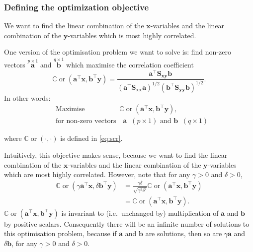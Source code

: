\documentclass[]{book}
\theoremstyle{definition}
\theoremstyle{definition}
\theoremstyle{definition}
\theoremstyle{remark}
\begin{document}
\hypertarget{defining-the-optimization-objective}{%
\subsubsection*{Defining the optimization objective}\label{defining-the-optimization-objective}}

We want to find the linear combination of the \(\mathbf x\)-variables and the linear combination of the \(\mathbf y\)-variables which is most highly correlated.

One version of the optimisation problem we want to solve is: find non-zero vectors \(\stackrel{p \times 1}{\mathbf a}\) and \(\stackrel{q \times 1}{\mathbf b}\) which maximise the correlation coefficient
\[
{\mathbb{C}\operatorname{or}}(\mathbf a^\top \mathbf x,\mathbf b^\top \mathbf y)=\frac{\mathbf a^\top \mathbf S_{\mathbf x\mathbf y}\mathbf b}{(\mathbf a^\top \mathbf S_{\mathbf x\mathbf x}\mathbf a)^{1/2}(\mathbf b^\top \mathbf S_{\mathbf y\mathbf y}\mathbf b)^{1/2}}.
\]
In other words:
\begin{align}
&\mbox{Maximise} \qquad\qquad \quad  {\mathbb{C}\operatorname{or}}(\mathbf a^\top \mathbf x,\mathbf b^\top \mathbf y),
\label{eq:opt26}\\
  &\mbox{for non-zero vectors}\quad  \mathbf a\;\; (p \times 1)\mbox{ and  } \mathbf b\;\; (q \times 1) \nonumber
\end{align}

where \({\mathbb{C}\operatorname{or}}(\cdot,\cdot)\) is defined in \eqref{eq:scr}.

Intuitively, this objective makes sense, because we want to find the linear combination of the \(\mathbf x\)-variables and the linear combination of the \(\mathbf y\)-variables which are most highly correlated.
However, note that for any \(\gamma>0\) and \(\delta>0\),
\begin{align}
  {\mathbb{C}\operatorname{or}}(\gamma\mathbf a^\top \mathbf x, \delta \mathbf b^\top \mathbf y)&= \frac{\gamma \delta}{\sqrt{\gamma^2 \delta^2}}{\mathbb{C}\operatorname{or}}(\mathbf a^\top \mathbf x,\mathbf b^\top \mathbf y)\\
  &={\mathbb{C}\operatorname{or}}(\mathbf a^\top \mathbf x,\mathbf b^\top \mathbf y).
  \label{eq:invar}
  \end{align}
\({\mathbb{C}\operatorname{or}}(\mathbf a^\top \mathbf x,\mathbf b^\top \mathbf y)\) is invariant to (i.e.~unchanged by) multiplication of \(\mathbf a\) and \(\mathbf b\) by positive scalars. Consequently there will be an infinite number of solutions to this optimisation problem, because if \(\mathbf a\) and \(\mathbf b\) are solutions, then so are \(\gamma \mathbf a\) and \(\delta \mathbf b\), for any \(\gamma>0\) and \(\delta>0\).
\end{document}
